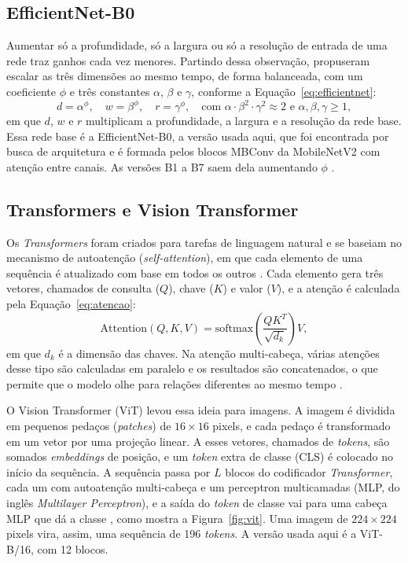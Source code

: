 \subsection{EfficientNet-B0}
\label{sec:efficientnet}

Aumentar só a profundidade, só a largura ou só a resolução de entrada de uma rede traz ganhos cada vez menores. Partindo dessa observação,  propuseram escalar as três dimensões ao mesmo tempo, de forma balanceada, com um coeficiente $\phi$ e três constantes $\alpha$, $\beta$ e $\gamma$, conforme a Equação~\ref{eq:efficientnet}:
\begin{equation}
	\label{eq:efficientnet}
	d = \alpha^{\phi}, \quad w = \beta^{\phi}, \quad r = \gamma^{\phi}, \quad \text{com } \alpha \cdot \beta^2 \cdot \gamma^2 \approx 2 \text{ e } \alpha, \beta, \gamma \geq 1,
\end{equation}
em que $d$, $w$ e $r$ multiplicam a profundidade, a largura e a resolução da rede base. Essa rede base é a EfficientNet-B0, a versão usada aqui, que foi encontrada por busca de arquitetura e é formada pelos blocos MBConv da MobileNetV2 com atenção entre canais. As versões B1 a B7 saem dela aumentando $\phi$ \cite{tan2019efficientnet}.

\subsection{Transformers e Vision Transformer}
\label{sec:vit}

Os \textit{Transformers} foram criados para tarefas de linguagem natural e se baseiam no mecanismo de autoatenção (\textit{self-attention}), em que cada elemento de uma sequência é atualizado com base em todos os outros \cite{vaswani2017attention}. Cada elemento gera três vetores, chamados de consulta ($Q$), chave ($K$) e valor ($V$), e a atenção é calculada pela Equação~\ref{eq:atencao}:
\begin{equation}
	\label{eq:atencao}
	\text{Attention}(Q, K, V) = \text{softmax}\left(\frac{QK^{T}}{\sqrt{d_k}}\right) V,
\end{equation}
em que $d_k$ é a dimensão das chaves. Na atenção multi-cabeça, várias atenções desse tipo são calculadas em paralelo e os resultados são concatenados, o que permite que o modelo olhe para relações diferentes ao mesmo tempo \cite{vaswani2017attention}.

O Vision Transformer (ViT) levou essa ideia para imagens. A imagem é dividida em pequenos pedaços (\textit{patches}) de $16 \times 16$ pixels, e cada pedaço é transformado em um vetor por uma projeção linear. A esses vetores, chamados de \textit{tokens}, são somados \textit{embeddings} de posição, e um \textit{token} extra de classe (CLS) é colocado no início da sequência. A sequência passa por $L$ blocos do codificador \textit{Transformer}, cada um com autoatenção multi-cabeça e um perceptron multicamadas (MLP, do inglês \textit{Multilayer Perceptron}), e a saída do \textit{token} de classe vai para uma cabeça MLP que dá a classe \cite{dosovitskiy2021vit}, como mostra a Figura~\ref{fig:vit}. Uma imagem de $224 \times 224$ pixels vira, assim, uma sequência de 196 \textit{tokens}. A versão usada aqui é a ViT-B/16, com 12 blocos.

